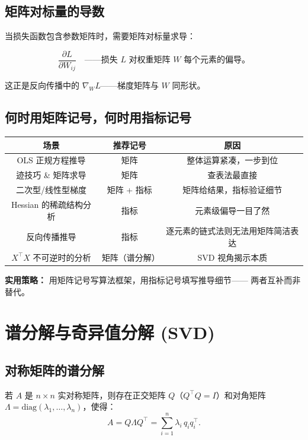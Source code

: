 \subsection{矩阵对标量的导数}

当损失函数包含参数矩阵时，需要矩阵对标量求导：

\begin{equation}
    \frac{\partial L}{\partial W_{ij}} \quad \text{——损失 $L$ 对权重矩阵 $W$ 每个元素的偏导。}
\end{equation}

这正是反向传播中的 $\nabla_W L$——梯度矩阵与 $W$ 同形状。

\subsection{何时用矩阵记号，何时用指标记号}

\begin{center}
\renewcommand{\arraystretch}{1.4}
\begin{tabular}{c|c|c}
\toprule
\textbf{场景} & \textbf{推荐记号} & \textbf{原因} \\
\midrule
OLS 正规方程推导 & 矩阵 & 整体运算紧凑，一步到位 \\
迹技巧 \& 矩阵求导 & 矩阵 & 查表法最直接 \\
二次型/线性型梯度 & 矩阵 + 指标 & 矩阵给结果，指标验证细节 \\
Hessian 的稀疏结构分析 & 指标 & 元素级偏导一目了然 \\
反向传播推导 & 指标 & 逐元素的链式法则无法用矩阵简洁表达 \\
$X^\top X$ 不可逆时的分析 & 矩阵（谱分解） & SVD 视角揭示本质 \\
\bottomrule
\end{tabular}
\end{center}

\textbf{实用策略：} 用矩阵记号写算法框架，用指标记号填写推导细节——
两者互补而非替代。

\section{谱分解与奇异值分解 (SVD)}

\subsection{对称矩阵的谱分解}

若 $A$ 是 $n \times n$ 实对称矩阵，则存在正交矩阵 $Q$（$Q^\top Q = I$）和对角矩阵 $\Lambda = \mathrm{diag}(\lambda_1, \dots, \lambda_n)$，使得：
\begin{equation}\label{eq:spectral}
    A = Q \Lambda Q^\top = \sum_{i=1}^{n} \lambda_i \, q_i q_i^\top.
\end{equation}

